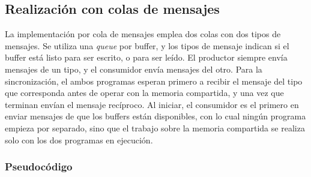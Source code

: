 \subsection{Realización con colas de mensajes}

La implementación por cola de mensajes emplea dos colas con dos tipos de mensajes. Se utiliza una \textit{queue} por buffer, y los tipos de mensaje indican si el buffer está listo para ser escrito, o para ser leído. El productor siempre envía mensajes de un tipo, y el consumidor envía mensajes del otro. Para la sincronización, el ambos programas esperan primero a recibir el mensaje del tipo que corresponda antes de operar con la memoria compartida, y una vez que terminan envían el mensaje recíproco. Al iniciar, el consumidor es el primero en enviar mensajes de que los buffers están disponibles, con lo cual ningún programa empieza por separado, sino que el trabajo sobre la memoria compartida se realiza solo con los dos programas en ejecución.

\subsubsection{Pseudocódigo}

